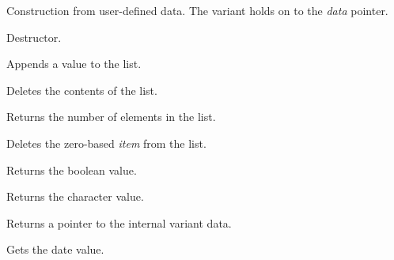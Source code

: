 
Construction from user-defined data. The variant holds on to the {\it data} pointer.

\label{wxvariantdtor}


Destructor.

\label{wxvariantappend}


Appends a value to the list.

\label{wxvariantclearlist}


Deletes the contents of the list.

\label{wxvariantgetcount}


Returns the number of elements in the list.

\label{wxvariantdelete}


Deletes the zero-based {\it item} from the list.

\label{wxvariantgetbool}


Returns the boolean value.

\label{wxvariantgetchar}


Returns the character value.

\label{wxvariantgetdata}


Returns a pointer to the internal variant data.

\label{wxvariantgetdate}


Gets the date value.

\label{wxvariantgetdouble}

